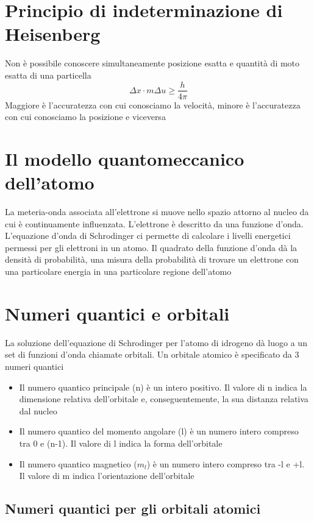 \documentclass[a4paper,11pt]{report}
\begin{document}
\section{Principio di indeterminazione di Heisenberg}

Non è possibile conoscere simultaneamente posizione esatta e quantità di moto esatta di una particella
\begin{equation*}
	\Delta x \cdot m \Delta u \ge \frac{h}{4\pi}
\end{equation*}
Maggiore è l'accuratezza con cui conosciamo la velocità, minore è l'accuratezza con cui conosciamo la posizione e viceversa

\section{Il modello quantomeccanico dell'atomo}

La meteria-onda associata all'elettrone si muove nello spazio attorno al nucleo da cui è continuamente influenzata. L'elettrone è descritto da una funzione d'onda. 
L'equazione d'onda di Schrodinger ci permette di calcolare i livelli energetici permessi per gli elettroni in un atomo. 
Il quadrato della funzione d'onda dà la densità di probabilità, una misura della probabilità di trovare un elettrone con una particolare energia in una particolare regione dell'atomo

\section{Numeri quantici e orbitali}

La soluzione dell'equazione di Schrodinger per l'atomo di idrogeno dà luogo a un set di funzioni d'onda chiamate orbitali. 
Un orbitale atomico è specificato da 3 numeri quantici
\begin{itemize}
	\item Il numero quantico principale (n) è un intero positivo. Il valore di n indica la dimensione relativa dell'orbitale e, conseguentemente, la sua distanza relativa dal nucleo
	\item Il numero quantico del momento angolare (l) è un numero intero compreso tra 0 e (n-1). Il valore di l indica la forma dell'orbitale
	\item Il numero quantico magnetico ($m_l$) è un numero intero compreso tra -l e +l. Il valore di m indica l'orientazione dell'orbitale
\end{itemize}

\subsection*{Numeri quantici per gli orbitali atomici}
\end{document}

